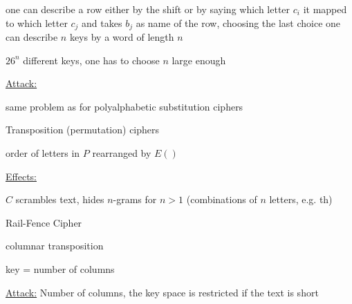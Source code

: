 \documentclass[landscape, a4paper]{article}
\begin{document}
\begin{minipage}[t]{0.198\pagewidth}
\begin{betterlist}
\begin{betterlist}
\begin{betterlist}
\begin{betterlist}
					\begin{betterlist}
						\item one can describe a row either by the shift or by saying which letter $c_i$ it mapped to which letter $c_j$ and takes $b_j$ as name of the row, choosing the last choice one can describe $n$ keys by a word of length $n$
					\end{betterlist}
					\item $26^n$ different keys, one has to choose $n$ large enough
					\item \underline{Attack:}
					\begin{betterlist}
						\item same problem as for polyalphabetic substitution ciphers
					\end{betterlist}
				\end{betterlist}
			\end{betterlist}
		\end{betterlist}
	\end{betterlist}
	\begin{betterlist}
		\item \alert{Transposition (permutation) ciphers}
		\begin{betterlist}
			\item order of letters in $P$ rearranged by $E()$
			\item \underline{Effects:}
			\begin{betterlist}
				\item $C$ scrambles text, hides \alert{$n$-grams} for $n > 1$ (combinations of $n$ letters, e.g. th)
			\end{betterlist}
		\end{betterlist}
		\begin{betterlist}
			\item \alert{Rail-Fence Cipher}
			\begin{betterlist}
				\item columnar transposition
				\item \alert{key} = number of columns
				\item \underline{Attack:} Number of columns, the key space is restricted if the text is short
			\end{betterlist}
		\end{betterlist}
	\end{betterlist}

\end{minipage}
\end{document}
